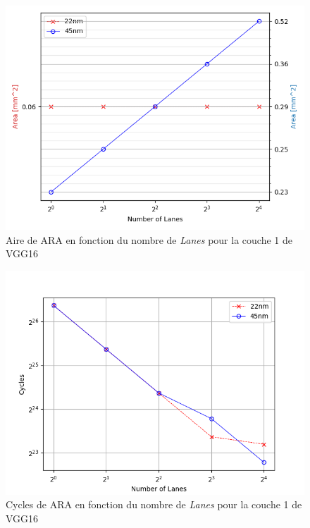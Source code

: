 \documentclass[11pt,letterpaper]{article}
\begin{document}
\begin{multicols}{2}
    \begin{figure}[H]
        \centering
        \includegraphics[width=\linewidth]{area.png}
        \caption{Aire de ARA en fonction du nombre de \textit{Lanes} pour la couche 1 de VGG16}
        \label{fig:area}
    \end{figure}
    \begin{figure}[H]
        \centering
        \includegraphics[width=\linewidth]{cycles.png}
        \caption{Cycles de ARA en fonction du nombre de \textit{Lanes} pour la couche 1 de VGG16}
        \label{fig:cycles}
    \end{figure}
    \begin{figure}[H]
        \centering

\end{figure}
\end{multicols}
\end{document}
